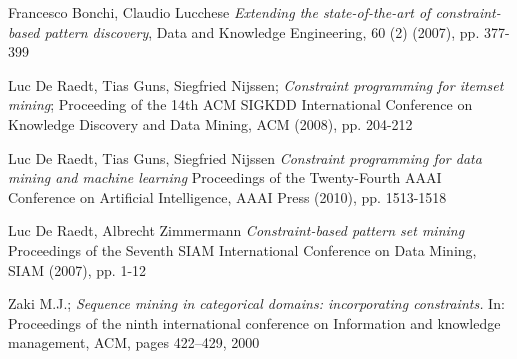 \documentclass{eplmastersthesis}
\begin{document}
\begin{thebibliography}{9}
Francesco Bonchi, Claudio Lucchese
\textit{Extending the state-of-the-art of constraint-based pattern discovery},
Data and Knowledge Engineering, 60 (2) (2007), pp. 377-399

Luc De Raedt, Tias Guns, Siegfried Nijssen;
\textit{Constraint programming for itemset mining};
Proceeding of the 14th ACM SIGKDD International Conference on Knowledge Discovery and Data Mining, ACM (2008), pp. 204-212

Luc De Raedt, Tias Guns, Siegfried Nijssen
\textit{Constraint programming for data mining and machine learning}
Proceedings of the Twenty-Fourth AAAI Conference on Artificial Intelligence, AAAI Press (2010), pp. 1513-1518

Luc De Raedt, Albrecht Zimmermann
\textit{Constraint-based pattern set mining}
Proceedings of the Seventh SIAM International Conference on Data Mining, SIAM (2007), pp. 1-12

Zaki M.J.;
\textit{Sequence mining in categorical domains: incorporating constraints.}
In: Proceedings of the ninth international conference on Information and knowledge management, ACM, pages 422–429, 2000

\end{thebibliography}

\thispagestyle{empty}		
\backcoverpage
\end{document}
